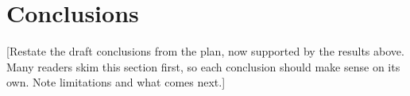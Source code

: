 \documentclass[11pt]{article}
\newcommand{\todo}[1]{\textcolor{todocolor}{[#1]}}
\newcommand{\todo}[1]{}
\begin{document}
\section{Conclusions}

\todo{Restate the draft conclusions from the plan, now supported by the results above. Many readers skim this section first, so each conclusion should make sense on its own. Note limitations and what comes next.}



\end{document}
